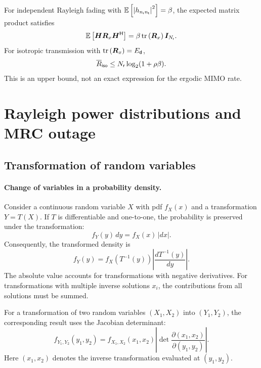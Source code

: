 For independent Rayleigh fading with
$\mathbb{E}\left[\left|h_{n_{\mathsf{r}}n_{\mathsf{t}}}\right|^2\right]=\beta$, the expected matrix product satisfies
\begin{equation*}
	\mathbb{E}\left[\bm{H}\bm{R}_x{\bm{H}}^{\mathsf{H}}\right]
	=\beta\operatorname{tr}\left(\bm{R}_x\right)\bm{I}_{N_{\mathsf{r}}}.
\end{equation*}
For isotropic transmission with
$\operatorname{tr}\left(\bm{R}_x\right)=E_{\mathsf{d}}$,
\begin{equation*}
	\overline R_{\mathsf{iso}}
	\leq N_{\mathsf{r}}\log_2(1+\rho\beta).
\end{equation*}
This is an upper bound, not an exact expression for the ergodic MIMO rate.



\section{Rayleigh power distributions and MRC outage}
\label{app:rayleigh-gamma}


\subsection{Transformation of random variables}

\paragraph{Change of variables in a probability density.}
Consider a continuous random variable $X$ with \ac{pdf} $f_X(x)$ and a transformation $Y=T(X)$. If $T$ is differentiable and one-to-one, the probability is preserved under the transformation:
\begin{equation*}
	f_Y(y)\,dy=f_X(x)\,|dx|.
\end{equation*}
Consequently, the transformed density is
\begin{equation}\label{eq:app-pdf-transform}
	\boxed{
		f_Y(y)=f_X(T^{-1}(y))
		\left|\frac{dT^{-1}(y)}{dy}\right|.
	}
\end{equation}
The absolute value accounts for transformations with negative derivatives. For transformations with multiple inverse solutions $x_i$, the contributions from all solutions must be summed.

For a transformation of two random variables $(X_1,X_2)$ into $(Y_1,Y_2)$, the corresponding result uses the Jacobian determinant:
\begin{equation}\label{eq:app-pdf-jacobian}
	f_{Y_1,Y_2}(y_1,y_2)
	=f_{X_1,X_2}(x_1,x_2)
	\left|
	\det{\frac{\partial(x_1,x_2)}
		{\partial(y_1,y_2)}}
	\right|.
\end{equation}
Here $(x_1,x_2)$ denotes the inverse transformation evaluated at $(y_1,y_2)$.

